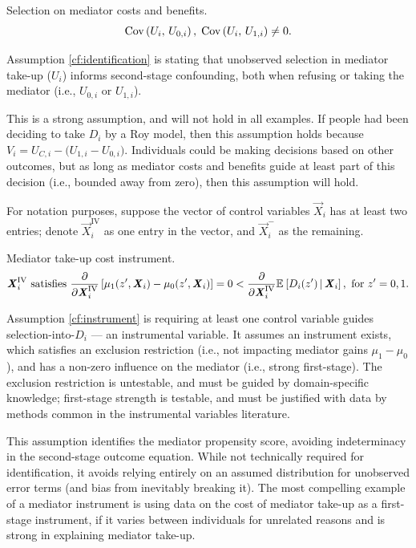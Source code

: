 \begin{assumptionCF}
    \label{cf:identification}
    Selection on mediator costs and benefits.
    \[ \text{Cov} \left( U_i, \, U_{0,i} \right), \; \text{Cov} \left( U_i, \, U_{1,i} \right) \neq 0. \]
\end{assumptionCF}
\noindent
Assumption \ref{cf:identification} is stating that unobserved selection in mediator take-up ($U_i$) informs second-stage confounding, both when refusing or taking the mediator (i.e., $U_{0,i}$ or $U_{1,i}$).

This is a strong assumption, and will not hold in all examples.
If people had been deciding to take $D_i$ by a Roy model, then this assumption holds because $V_i = U_{C,i} - \big( U_{1,i} - U_{0,i} \big)$.
Individuals could be making decisions based on other outcomes, but as long as mediator costs and benefits guide at least part of this decision (i.e., bounded away from zero), then this assumption will hold.

For notation purposes, suppose the vector of control variables $\vec X_i$ has at least two entries;
denote $\vec X_i^{\text{IV}}$ as one entry in the vector, and $\vec X_i^-$ as the remaining.
\begin{assumptionCF}
    \label{cf:instrument}
    Mediator take-up cost instrument.
    \[ \boldsymbol{\mathit{X}}_i^{\text{IV}} \textnormal{ satisfies }
    \frac{\partial}{\partial\boldsymbol{\mathit{X}}_i^{\text{IV}}}\left[
        \mu_1(z', \boldsymbol{\mathit{X}}_i) - \mu_0(z', \boldsymbol{\mathit{X}}_i)\right] = 0
        < \frac{\partial}{\partial\boldsymbol{\mathit{X}}_i^{\text{IV}}}\mathbb{E}_{} \left[ D_i(z') \, \middle\vert \, \boldsymbol{\mathit{X}}_i \right],
        \textnormal{ for } z' = 0, 1. \]
\end{assumptionCF}
\noindent
Assumption \ref{cf:instrument} is requiring at least one control variable guides selection-into-$D_i$ --- an instrumental variable.
It assumes an instrument exists, which satisfies an exclusion restriction (i.e., not impacting mediator gains $\mu_1-\mu_0$), and has a non-zero influence on the mediator (i.e., strong first-stage).
The exclusion restriction is untestable, and must be guided by domain-specific knowledge; first-stage strength is testable, and must be justified with data by methods common in the instrumental variables literature.

This assumption identifies the mediator propensity score, avoiding indeterminacy in the second-stage outcome equation.
While not technically required for identification, it avoids relying entirely on an assumed distribution for unobserved error terms (and bias from inevitably breaking it).
The most compelling example of a mediator instrument is using data on the cost of mediator take-up as a first-stage instrument, if it varies between
individuals for unrelated reasons and is strong in explaining mediator take-up.

